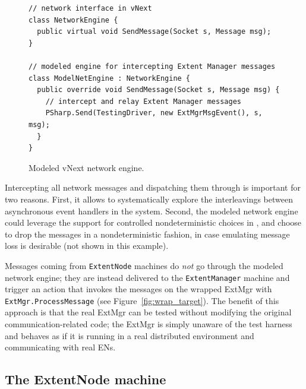 \begin{figure}[t]
\begin{lstlisting}
// network interface in vNext
class NetworkEngine {
  public virtual void SendMessage(Socket s, Message msg);
}

// modeled engine for intercepting Extent Manager messages
class ModelNetEngine : NetworkEngine {
  public override void SendMessage(Socket s, Message msg) {
    // intercept and relay Extent Manager messages
    PSharp.Send(TestingDriver, new ExtMgrMsgEvent(), s, msg);
  }
}
\end{lstlisting}
\vspace{-5mm}
\caption{Modeled vNext network engine.}
\label{fig:enginecode}
\vspace{-3mm}
\end{figure}

Intercepting all network messages and dispatching them through \psharp is important for two reasons. First, it allows \psharp to systematically explore the interleavings between asynchronous event handlers in the system. Second, the modeled network engine could leverage the support for controlled nondeterministic choices in \psharp, and choose to drop the messages in a nondeterministic fashion, in case emulating message loss is desirable (not shown in this example).

Messages coming from \texttt{ExtentNode} machines do \emph{not} go through the modeled network engine; they are instead delivered to the \texttt{ExtentManager} machine and trigger an action that invokes the messages on the wrapped ExtMgr with \texttt{ExtMgr.ProcessMessage} (see Figure~\ref{fig:wrap_target}). The benefit of this approach is that the real ExtMgr can be tested without modifying the original communication-related code; the ExtMgr is simply unaware of the \psharp test harness and behaves as if it is running in a real distributed environment and communicating with real ENs.

\subsection{The ExtentNode machine}
\label{sec:method:model_en}

